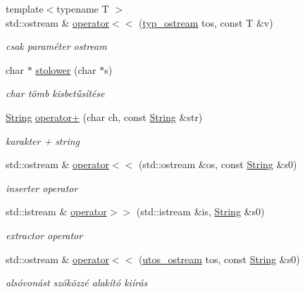 \begin{DoxyCompactItemize}
{\footnotesize template$<$typename T $>$ }\\std\+::ostream \& \mbox{\hyperlink{schtring_8hpp_aa279b7074acadd17c4bf119c9d5f7a53}{operator$<$$<$}} (\mbox{\hyperlink{structtyp__ostream}{typ\+\_\+ostream}} tos, const T \&v)
\begin{DoxyCompactList}\small\item\em csak paraméter ostream \end{DoxyCompactList}\item 
char $\ast$ \mbox{\hyperlink{schtring_8hpp_a9d7d0d0ea2b8f0f7c6d53fe66fc0b301}{stolower}} (char $\ast$s)
\begin{DoxyCompactList}\small\item\em char tömb kisbetűsítése \end{DoxyCompactList}\item 
\mbox{\hyperlink{class_string}{String}} \mbox{\hyperlink{schtring_8hpp_a8d89d501f582c3a65df894dbd030bbcf}{operator+}} (char ch, const \mbox{\hyperlink{class_string}{String}} \&str)
\begin{DoxyCompactList}\small\item\em karakter + string \end{DoxyCompactList}\item 
std\+::ostream \& \mbox{\hyperlink{schtring_8hpp_aef14876e55f43fb4ffa7b91664467ecb}{operator$<$$<$}} (std\+::ostream \&os, const \mbox{\hyperlink{class_string}{String}} \&s0)
\begin{DoxyCompactList}\small\item\em inserter operator \end{DoxyCompactList}\item 
std\+::istream \& \mbox{\hyperlink{schtring_8hpp_aea8ed420ad5e70828bc42b0fb9b49366}{operator$>$$>$}} (std\+::istream \&is, \mbox{\hyperlink{class_string}{String}} \&s0)
\begin{DoxyCompactList}\small\item\em extractor operator \end{DoxyCompactList}\item 
std\+::ostream \& \mbox{\hyperlink{schtring_8hpp_a06c0f45780d45c035c1eabecbb34198d}{operator$<$$<$}} (\mbox{\hyperlink{structutos__ostream}{utos\+\_\+ostream}} tos, const \mbox{\hyperlink{class_string}{String}} \&s0)
\begin{DoxyCompactList}\small\item\em alsóvonást szóközzé alakító kiírás \end{DoxyCompactList}\end{DoxyCompactItemize}
